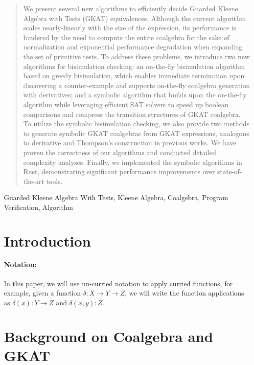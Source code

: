 \documentclass[conference]{IEEEtran}
\begin{document}
\begin{abstract}
We present several new algorithms to efficiently decide Guarded Kleene Algebra with Tests (GKAT) equivalences.
Although the current algorithm scales nearly-linearly with the size of the expression, its performance is hindered by the need to compute the entire coalgebra for the sake of normalization and exponential performance degradation when expanding the set of primitive tests.
To address these problems, we introduce two new algorithms for bisimulation checking: an on-the-fly bisimulation algorithm based on greedy bisimulation, which enables immediate termination upon discovering a counter-example and supports on-the-fly coalgebra generation with derivatives; and a symbolic algorithm that builds upon the on-the-fly algorithm while leveraging efficient SAT solvers to speed up boolean comparisons and compress the transition structures of GKAT coalgebra.
To utilize the symbolic bisimulation checking, we also provide two methods to generate symbolic GKAT coalgebras from GKAT expressions, analogous to derivative and Thompson's construction in previous works.
We have proven the correctness of our algorithms and conducted detailed complexity analyses.
Finally, we implemented the symbolic algorithms in Rust, demonstrating significant performance improvements over state-of-the-art tools.
\end{abstract}

\begin{IEEEkeywords}
Guarded Kleene Algebra With Tests, Kleene Algebra, Coalgebra, Program Verification, Algorithm
\end{IEEEkeywords}



\section{Introduction}

\paragraph{Notation:} In this paper, we will use un-curried notation to apply curried functions, for example, given a function \(δ: X → Y → Z\), we will write the function applications as \(δ(x): Y → Z\) and \(δ(x, y): Z\).

\section{Background on Coalgebra and GKAT}
\end{document}
